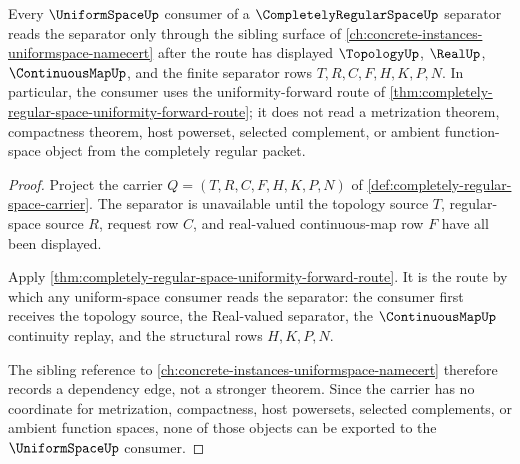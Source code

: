 \begin{theorem}
\label{thm:completely-regular-space-uniformspace-sibling-route}
Every $\UniformSpaceUp$ consumer of a $\CompletelyRegularSpaceUp$ separator reads the separator only through the sibling surface of \autoref{ch:concrete-instances-uniformspace-namecert} after the route has displayed $\TopologyUp$, $\RealUp$, $\ContinuousMapUp$, and the finite separator rows $T,R,C,F,H,K,P,N$. In particular, the consumer uses the uniformity-forward route of \autoref{thm:completely-regular-space-uniformity-forward-route}; it does not read a metrization theorem, compactness theorem, host powerset, selected complement, or ambient function-space object from the completely regular packet.
\end{theorem}
\begin{proof}
Project the carrier $Q=(T,R,C,F,H,K,P,N)$ of \autoref{def:completely-regular-space-carrier}. The separator is unavailable until the topology source $T$, regular-space source $R$, request row $C$, and real-valued continuous-map row $F$ have all been displayed.

Apply \autoref{thm:completely-regular-space-uniformity-forward-route}. It is the route by which any uniform-space consumer reads the separator: the consumer first receives the topology source, the Real-valued separator, the $\ContinuousMapUp$ continuity replay, and the structural rows $H,K,P,N$.

The sibling reference to \autoref{ch:concrete-instances-uniformspace-namecert} therefore records a dependency edge, not a stronger theorem. Since the carrier has no coordinate for metrization, compactness, host powersets, selected complements, or ambient function spaces, none of those objects can be exported to the $\UniformSpaceUp$ consumer.
\end{proof}

